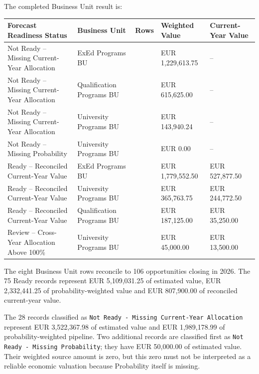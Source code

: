 \documentclass[11pt,a4paper]{article}
\begin{document}
The completed Business Unit result is:

\begin{tabularx}{\textwidth}{
    >{\raggedright\arraybackslash}p{4.8cm}
    >{\raggedright\arraybackslash}p{2.7cm}
    >{\centering\arraybackslash}p{1.2cm}
    >{\raggedleft\arraybackslash}p{2.4cm}
    >{\raggedleft\arraybackslash}p{2.4cm}
}

\toprule

Forecast Readiness Status
&
Business Unit
&
Rows
&
Weighted Value
&
Current-Year Value
\\

\midrule

Not Ready -- Missing Current-Year Allocation
&
ExEd Programs BU
&
18
&
EUR 1,229,613.75
&
--
\\

Not Ready -- Missing Current-Year Allocation
&
Qualification Programs BU
&
3
&
EUR 615,625.00
&
--
\\

Not Ready -- Missing Current-Year Allocation
&
University Programs BU
&
7
&
EUR 143,940.24
&
--
\\

Not Ready -- Missing Probability
&
University Programs BU
&
2
&
EUR 0.00
&
--
\\

Ready -- Reconciled Current-Year Value
&
ExEd Programs BU
&
60
&
EUR 1,779,552.50
&
EUR 527,877.50
\\

Ready -- Reconciled Current-Year Value
&
University Programs BU
&
13
&
EUR 365,763.75
&
EUR 244,772.50
\\

Ready -- Reconciled Current-Year Value
&
Qualification Programs BU
&
2
&
EUR 187,125.00
&
EUR 35,250.00
\\

Review -- Cross-Year Allocation Above 100\%
&
University Programs BU
&
1
&
EUR 45,000.00
&
EUR 13,500.00
\\

\bottomrule

\end{tabularx}

The eight Business Unit rows reconcile to 106 opportunities closing in 2026.
The 75 Ready records represent EUR 5,109,031.25 of estimated value,
EUR 2,332,441.25 of probability-weighted value and EUR 807,900.00 of
reconciled current-year value.

The 28 records classified as
\texttt{Not Ready - Missing Current-Year Allocation} represent
EUR 3,522,367.98 of estimated value and EUR 1,989,178.99 of probability-weighted
pipeline. Two additional records are classified first as
\texttt{Not Ready - Missing Probability}; they have EUR 50,000.00 of estimated
value. Their weighted source amount is zero, but this zero must not be interpreted
as a reliable economic valuation because Probability itself is missing.
\end{document}

